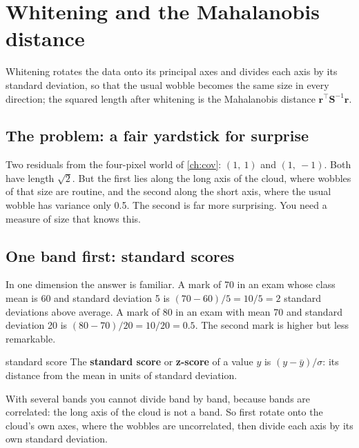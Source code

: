 \documentclass[11pt,a4paper,oneside,openany]{book}
\newcommand{\B}[1]{{\symbf{#1}}}
\newcommand{\B}[1]{{\bm{#1}}}
\newcommand{\T}{^{\top}}
\newcommand{\vr}{\B{r}}
\newcommand{\mS}{\B{S}}
\begin{document}
\chapter{Whitening and the Mahalanobis distance}
\label{ch:whiten}

\begin{onething}
Whitening rotates the data onto its principal axes and divides each axis by its standard deviation, so that the usual wobble
becomes the same size in every direction; the squared length after whitening is the Mahalanobis distance
$\vr\T\mS^{-1}\vr$.
\end{onething}

\section{The problem: a fair yardstick for surprise}

Two residuals from the four-pixel world of \cref{ch:cov}: $(1,\ 1)$ and $(1,\ -1)$. Both have length $\sqrt2$. But the first
lies along the long axis of the cloud, where wobbles of that size are routine, and the second along the short axis, where
the usual wobble has variance only 0.5. The second is far more surprising. You need a measure of size that knows this.

\section{One band first: standard scores}

In one dimension the answer is familiar. A mark of 70 in an exam whose class mean is 60 and standard deviation 5 is
$(70-60)/5=10/5=2$ standard deviations above average. A mark of 80 in an exam with mean 70 and standard deviation 20 is
$(80-70)/20=10/20=0.5$. The second mark is higher but less remarkable.

\begin{defn}{standard score}
The \textbf{standard score} or \textbf{z-score} of a value $y$ is $(y-\bar y)/\sigma$: its distance from the mean in units of
standard deviation.
\end{defn}

With several bands you cannot divide band by band, because bands are correlated: the long axis of the cloud is not a band. So
first rotate onto the cloud's own axes, where the wobbles are uncorrelated, then divide each axis by its own standard
deviation.
\end{document}
